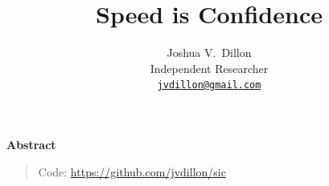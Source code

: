 \documentclass[10pt,twocolumn,letterpaper]{article}
\title{\vspace{-1em}Speed is Confidence\vspace{-0.5em}}
\author{Joshua V.\ Dillon\\Independent Researcher\\\tt\small \href{mailto:jvdillon@gmail.com}{jvdillon@gmail.com}}
\date{\vspace{-2em}}
\renewenvironment{abstract}{\centerline{\large\bfseries Abstract}\vspace{-0.12in}\begin{quote}}{\par\end{quote}\vskip 0.12in}
\begin{document}
\maketitle
\begin{abstract}


Code: \url{https://github.com/jvdillon/sic}
\end{abstract}











\newpage

\end{document}
